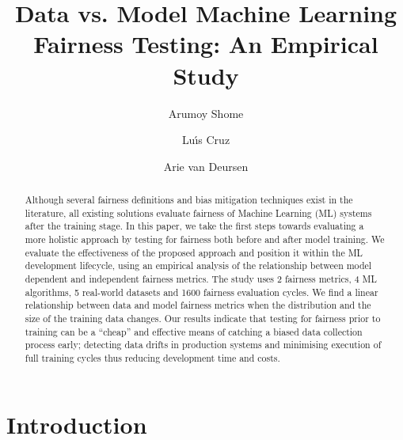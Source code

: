 \documentclass[sigconf]{acmart}
\begin{document}
\title{Data vs. Model Machine Learning Fairness Testing: An Empirical Study}

\author{Arumoy Shome}

\author{Lu{\'\i}s Cruz}

\author{Arie van Deursen}

\begin{abstract}

Although several fairness definitions and bias mitigation techniques
  exist in the literature, all existing solutions evaluate fairness of
  Machine Learning (ML) systems after the training stage. In this
  paper, we take the first steps towards evaluating a more holistic
  approach by testing for fairness both before and after model
  training. We evaluate the effectiveness of the proposed approach and
  position it within the ML development lifecycle, using an empirical
  analysis of the relationship between model dependent and independent
  fairness metrics. The study uses 2 fairness metrics, 4 ML
  algorithms, 5 real-world datasets and 1600 fairness evaluation
  cycles. We find a linear relationship between data and model
  fairness metrics when the distribution and the size of the training
  data changes. Our results indicate that testing for fairness prior
  to training can be a ``cheap'' and effective means of catching
  a biased data collection process early; detecting data drifts in
  production systems and minimising execution of full training cycles
  thus reducing development time and costs.

\end{abstract}

\maketitle

\section{Introduction}\label{sec:intro}
\end{document}
